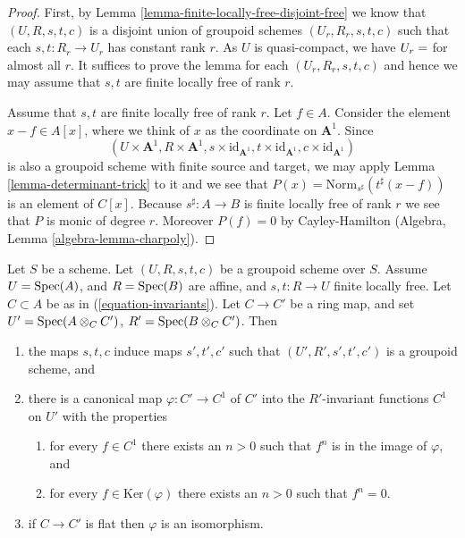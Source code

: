 \begin{proof}
First, by Lemma \ref{lemma-finite-locally-free-disjoint-free}
we know that $(U, R, s, t, c)$ is a disjoint union
of groupoid schemes $(U_r, R_r, s, t, c)$ such that each $s, t : R_r \to U_r$
has constant rank $r$. As $U$ is quasi-compact, we have $U_r = \empty$ for
almost all $r$. It suffices to prove the lemma for each $(U_r, R_r, s, t, c)$
and hence we may assume that $s, t$ are finite locally free of rank $r$.

\medskip\noindent
Assume that $s, t$ are finite locally free of rank $r$.
Let $f \in A$. Consider the element $x - f \in A[x]$, where we think
of $x$ as the coordinate on $\mathbf{A}^1$.
Since
$$
(U \times \mathbf{A}^1, R \times \mathbf{A}^1,
s \times \text{id}_{\mathbf{A}^1},
t \times \text{id}_{\mathbf{A}^1},
c \times \text{id}_{\mathbf{A}^1})
$$
is also a groupoid scheme with finite source and target, we may apply
Lemma \ref{lemma-determinant-trick} to it and we see that
$P(x) = \text{Norm}_{s^\sharp}(t^\sharp(x - f))$
is an element of $C[x]$. Because $s^\sharp : A \to B$ is finite locally
free of rank $r$ we see that $P$ is monic of degree $r$.
Moreover $P(f) = 0$ by Cayley-Hamilton
(Algebra, Lemma \ref{algebra-lemma-charpoly}).
\end{proof}

\begin{lemma}
\label{lemma-invariants-base-change}
Let $S$ be a scheme. Let $(U, R, s, t, c)$ be a groupoid scheme over $S$.
Assume $U = \mathop{\rm Spec}(A)$, and $R = \mathop{\rm Spec}(B)$ are affine, and
$s, t : R \to U$ finite locally free. Let $C \subset A$ be as in
(\ref{equation-invariants}). Let $C \to C'$ be a ring map, and set
$U' = \mathop{\rm Spec}(A \otimes_C C')$,
$R' = \mathop{\rm Spec}(B \otimes_C C')$.
Then
\begin{enumerate}
\item the maps $s, t, c$ induce maps $s', t', c'$ such that
$(U', R', s', t', c')$ is a groupoid scheme, and
\item there is a canonical map $\varphi : C' \to C^1$ of $C'$ into
the $R'$-invariant functions $C^1$ on $U'$ with the properties
\begin{enumerate}
\item for every $f \in C^1$ there exists an $n > 0$ such that
$f^n$ is in the image of $\varphi$, and
\item for every $f \in \text{Ker}(\varphi)$ there exists
an $n > 0$ such that $f^n = 0$.
\end{enumerate}
\item if $C \to C'$ is flat then $\varphi$ is an isomorphism.
\end{enumerate}
\end{lemma}

